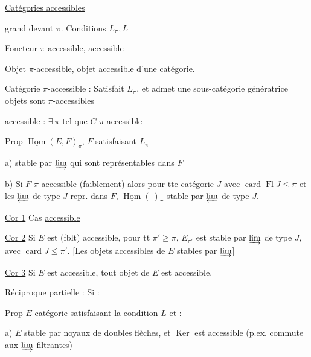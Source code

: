 \uline{Catégories accessibles}

  grand devant $\pi$. Conditions $L_\pi,L$

Foncteur $\pi$-accessible, accessible

Objet $\pi$-accessible, objet accessible d'une catégorie.

Catégorie $\pi$-accessible : Satisfait $L_\pi$, et admet une  sous-catégorie  génératrice   objets sont $\pi$-accessibles


accessible : $\exists\ \pi$ tel que $C$ $\pi$-accessible

\uline{Prop}  $\underline{\operatorname{Hom}}(E,F)_\pi$, $F$ satisfaisant $L_\pi$

a) stable par  $\varinjlim$ qui sont représentables dans $F$

b) Si $F$ $\pi$-accessible (faiblement) alors pour tte catégorie $J$ avec $\operatorname{card}\operatorname{Fl}J\leq\pi$ et les $\varprojlim$ de type $J$ repr. dans $F$, $\underline{\operatorname{Hom}}(\ )_\pi$ stable par $\varprojlim$ de type $J$.


\uline{Cor 1} Cas \uline{accessible}

\uline{Cor 2}  Si $E$ est (fblt) \deleted{\unsure{$\pi$}} \inserted{$\pi$-}accessible,  pour tt $\pi'\geq\pi$, $E_{\pi'}$ est stable par $\varinjlim$ de type $J$, avec $\operatorname{card} J\leq\pi'$. [Les objets accessibles de $E$ stables par  $\varinjlim$]

\uline{Cor 3} Si $E$ est accessible, tout objet de $E$ est accessible.

Réciproque  partielle : Si :

\uline{Prop}  $E$ catégorie satisfaisant la condition $L$ et :

a) $E$ stable par noyaux de doubles flèches, et $\operatorname{Ker}$ est accessible (p.ex. commute aux  $\varinjlim$ filtrantes)

